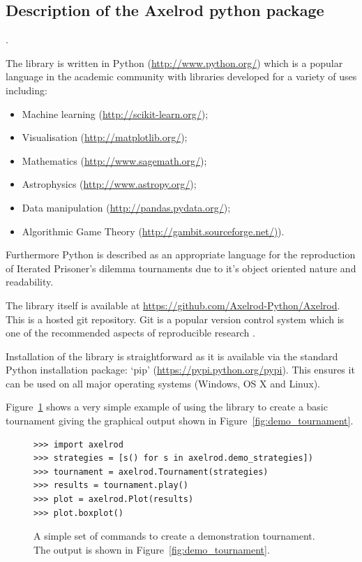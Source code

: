 \documentclass{article}
\begin{document}
\subsection{Description of the Axelrod python package}\label{sec:description-of-axelrod-python}.

The library is written in Python (\url{http://www.python.org/}) which is a
popular language in the academic community with libraries developed for a
variety of uses including:

\begin{itemize}
    \item Machine learning (\url{http://scikit-learn.org/});
    \item Visualisation (\url{http://matplotlib.org/});
    \item Mathematics (\url{http://www.sagemath.org/});
    \item Astrophysics (\url{http://www.astropy.org/});
    \item Data manipulation (\url{http://pandas.pydata.org/});
    \item Algorithmic Game Theory (\url{http://gambit.sourceforge.net/)}).
\end{itemize}

Furthermore \cite{Isaac2008} Python is described as an appropriate language for the
reproduction of Iterated Prisoner's dilemma tournaments due to it's object
oriented nature and readability.

The library itself is available at
\url{https://github.com/Axelrod-Python/Axelrod}. This is a hosted git
repository. Git is a popular version control system which is one of the
recommended aspects of reproducible research \cite{Crick2014a, Sandve2013}.

Installation of the library is straightforward as it is available via the
standard Python installation package: `pip'
(\url{https://pypi.python.org/pypi}). This ensures it can be used on all major
operating systems (Windows, OS X and Linux).

Figure~\ref{fig:demo_tournament_commands} shows a very simple example of using
the library to create a basic tournament giving the graphical output shown in
Figure~\ref{fig:demo_tournament}.

\begin{figure}[!hbtp]
    \begin{lstlisting}[frame=single]
>>> import axelrod
>>> strategies = [s() for s in axelrod.demo_strategies])
>>> tournament = axelrod.Tournament(strategies)
>>> results = tournament.play()
>>> plot = axelrod.Plot(results)
>>> plot.boxplot()
    \end{lstlisting}
    \caption{A simple set of commands to create a demonstration tournament. The
        output is shown in Figure~\ref{fig:demo_tournament}.}
    \label{fig:demo_tournament_commands}
\end{figure}
\end{document}
